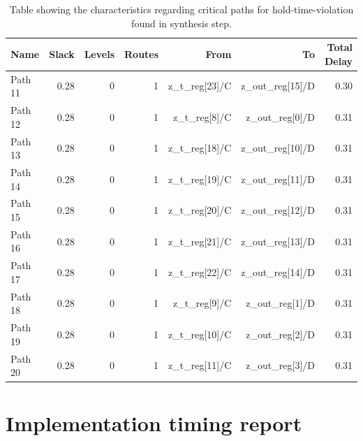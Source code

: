 \begin{table}[H]
    \centering
    \small
    \captionsetup{skip=10pt} 
    \begin{tabular}{lrrrrrr}
        \hline
        Name    & Slack & Levels & Routes  & From           & To               & Total Delay \\
        \hline
        Path 11 &  0.28 &      0 &       1 & z\_t\_reg[23]/C & z\_out\_reg[15]/D & 0.30       \\
        Path 12 &  0.28 &      0 &       1 & z\_t\_reg[8]/C  & z\_out\_reg[0]/D  & 0.31       \\
        Path 13 &  0.28 &      0 &       1 & z\_t\_reg[18]/C & z\_out\_reg[10]/D & 0.31       \\
        Path 14 &  0.28 &      0 &       1 & z\_t\_reg[19]/C & z\_out\_reg[11]/D & 0.31       \\
        Path 15 &  0.28 &      0 &       1 & z\_t\_reg[20]/C & z\_out\_reg[12]/D & 0.31       \\
        Path 16 &  0.28 &      0 &       1 & z\_t\_reg[21]/C & z\_out\_reg[13]/D & 0.31       \\
        Path 17 &  0.28 &      0 &       1 & z\_t\_reg[22]/C & z\_out\_reg[14]/D & 0.31       \\
        Path 18 &  0.28 &      0 &       1 & z\_t\_reg[9]/C  & z\_out\_reg[1]/D  & 0.31       \\
        Path 19 &  0.28 &      0 &       1 & z\_t\_reg[10]/C & z\_out\_reg[2]/D  & 0.31       \\
        Path 20 &  0.28 &      0 &       1 & z\_t\_reg[11]/C & z\_out\_reg[3]/D  & 0.31       \\
        \hline
    \end{tabular}
    \caption{Table showing the characteristics regarding critical paths for hold-time-violation found in synthesis step.}
    \label{tab:hold_synthesis}
\end{table}



\section{Implementation timing report}

